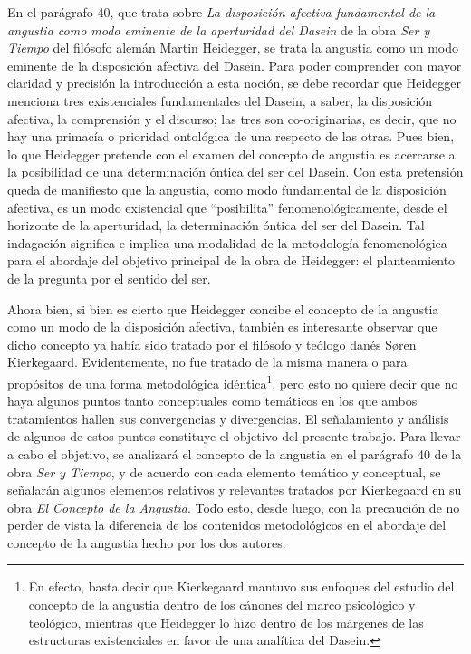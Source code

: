 \begin{refsection}
\vspace{-1em}
En el parágrafo 40, que trata sobre \emph{La disposición afectiva fundamental de la angustia como modo eminente de la aperturidad del Dasein} de la obra \emph{Ser y Tiempo} del filósofo alemán Martin Heidegger, se trata la angustia como un modo eminente de la disposición afectiva del Dasein. Para poder comprender con mayor claridad y precisión la introducción a esta noción, se debe recordar que Heidegger menciona tres existenciales fundamentales del Dasein, a saber, la disposición afectiva, la comprensión y el discurso; las tres son co-originarias, es decir, que no hay una primacía o prioridad ontológica de una respecto de las otras. Pues bien, lo que Heidegger pretende con el examen del concepto de angustia es acercarse a la posibilidad de una determinación óntica del ser del Dasein. Con esta pretensión queda de manifiesto que la angustia, como modo fundamental de la disposición afectiva, es un modo existencial que ``posibilita'' fenomenológicamente, desde el horizonte de la aperturidad, la determinación óntica del ser del Dasein. Tal indagación significa e implica una modalidad de la metodología fenomenológica para el abordaje del objetivo principal de la obra de Heidegger: el planteamiento de la pregunta por el sentido del ser.

Ahora bien, si bien es cierto que Heidegger concibe el concepto de la angustia como un modo de la disposición afectiva, también es interesante observar que dicho concepto ya había sido tratado por el filósofo y teólogo danés Søren Kierkegaard. Evidentemente, no fue tratado de la misma manera o para propósitos de una forma metodológica idéntica\footnote{En efecto, basta decir que Kierkegaard mantuvo sus enfoques del estudio del concepto de la angustia dentro de los cánones del marco psicológico y teológico, mientras que Heidegger lo hizo dentro de los márgenes de las estructuras existenciales en favor de una analítica del Dasein.}, pero esto no quiere decir que no haya algunos puntos tanto conceptuales como temáticos en los que ambos tratamientos hallen sus convergencias y divergencias. El señalamiento y análisis de algunos de estos puntos constituye el objetivo del presente trabajo. Para llevar a cabo el objetivo, se analizará el concepto de la angustia en el parágrafo 40 de la obra \emph{Ser y Tiempo}, y de acuerdo con cada elemento temático y conceptual, se señalarán algunos elementos relativos y relevantes tratados por Kierkegaard en su obra \emph{El Concepto de la Angustia}. Todo esto, desde luego, con la precaución de no perder de vista la diferencia de los contenidos metodológicos en el abordaje del concepto de la angustia hecho por los dos autores.


\end{refsection}
